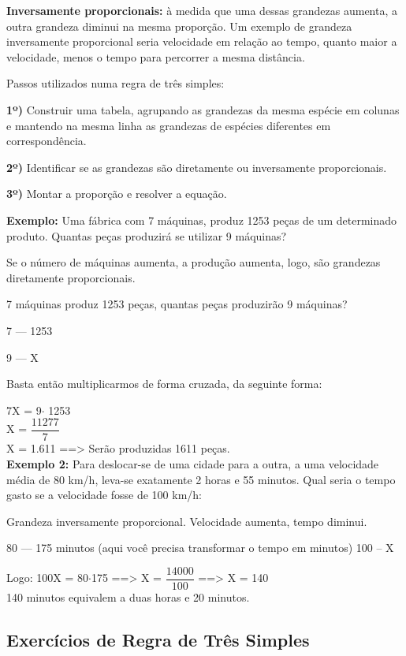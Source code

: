 \begin{multicols*}{2}
	\textbf{Inversamente proporcionais:} à medida que uma dessas grandezas aumenta, a outra grandeza diminui na mesma proporção. Um exemplo de grandeza inversamente proporcional seria velocidade em relação ao tempo, quanto maior a velocidade, menos o tempo para percorrer a mesma distância.

	Passos utilizados numa regra de três simples:

	\textbf{1º)} Construir uma tabela, agrupando as grandezas da mesma espécie em colunas e mantendo na mesma linha as grandezas de espécies diferentes em correspondência.

	\textbf{2º)} Identificar se as grandezas são diretamente ou inversamente proporcionais.

	\textbf{3º)} Montar a proporção e resolver a equação.

	\textbf{Exemplo:} Uma fábrica com 7 máquinas, produz 1253 peças de um determinado produto. Quantas peças produzirá se utilizar 9 máquinas?

	Se o número de máquinas aumenta, a produção aumenta, logo, são grandezas diretamente proporcionais.

	7 máquinas produz 1253 peças, quantas peças produzirão 9 máquinas?

	7  ---   1253

	9  ---      X

	Basta então multiplicarmos de forma cruzada, da seguinte forma:

	7X = 9$\cdot$ 1253  \\

	X = $\dfrac{11277}{7}$\\

	X = 1.611  ==> Serão produzidas 1611 peças.\\

	\textbf{Exemplo 2:} Para deslocar-se de uma cidade para a outra, a uma velocidade média de 80 km/h, leva-se exatamente 2 horas e 55 minutos. Qual seria o tempo gasto se a velocidade fosse de 100 km/h:

	Grandeza inversamente proporcional. Velocidade aumenta, tempo diminui.

	80  ---  175 minutos (aqui você precisa transformar o tempo em minutos)
	100 --    X

	Logo:   100X = 80$\cdot$175    ==>  X = $\dfrac{14000}{100}$    ==>   X = 140\\

	140 minutos equivalem a duas horas e 20 minutos.

	\subsection{Exercícios de Regra de Três Simples}


\end{multicols*}
